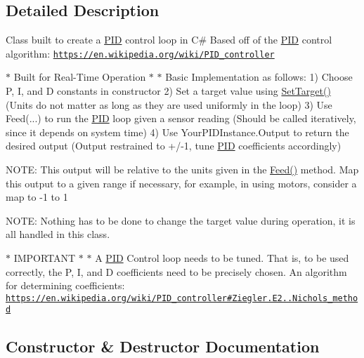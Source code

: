 \subsection{Detailed Description}
Class built to create a \hyperlink{class_robotics_library_1_1_controllers_1_1_p_i_d}{P\+ID} control loop in C\# Based off of the \hyperlink{class_robotics_library_1_1_controllers_1_1_p_i_d}{P\+ID} control algorithm\+: \href{https://en.wikipedia.org/wiki/PID_controller}{\tt https\+://en.\+wikipedia.\+org/wiki/\+P\+I\+D\+\_\+controller} 


\begin{DoxyItemize}
\item $\ast$ Built for Real-\/\+Time Operation $\ast$ $\ast$ Basic Implementation as follows\+: 1) Choose P, I, and D constants in constructor 2) Set a target value using {\ttfamily \hyperlink{class_robotics_library_1_1_controllers_1_1_p_i_d_aa4d528cb3b0adef1dfe42879319fcbb5}{Set\+Target()}} (Units do not matter as long as they are used uniformly in the loop) 3) Use {\ttfamily Feed(...)} to run the \hyperlink{class_robotics_library_1_1_controllers_1_1_p_i_d}{P\+ID} loop given a sensor reading (Should be called iteratively, since it depends on system time) 4) Use {\ttfamily Your\+P\+I\+D\+Instance.\+Output} to return the desired output (Output restrained to +/-\/1, tune \hyperlink{class_robotics_library_1_1_controllers_1_1_p_i_d}{P\+ID} coefficients accordingly)
\item N\+O\+TE\+: This output will be relative to the units given in the \hyperlink{class_robotics_library_1_1_controllers_1_1_p_i_d_a933cc736e6142b6ff531c33243c35549}{Feed()} method. Map this output to a given range if necessary, for example, in using motors, consider a map to -\/1 to 1
\item N\+O\+TE\+: Nothing has to be done to change the target value during operation, it is all handled in this class.
\item $\ast$ I\+M\+P\+O\+R\+T\+A\+NT $\ast$ $\ast$ A \hyperlink{class_robotics_library_1_1_controllers_1_1_p_i_d}{P\+ID} Control loop needs to be tuned. That is, to be used correctly, the P, I, and D coefficients need to be precisely chosen. An algorithm for determining coefficients\+: \href{https://en.wikipedia.org/wiki/PID_controller#Ziegler.E2.80.93Nichols_method}{\tt https\+://en.\+wikipedia.\+org/wiki/\+P\+I\+D\+\_\+controller\#\+Ziegler.\+E2..\+Nichols\+\_\+method} 
\end{DoxyItemize}

\subsection{Constructor \& Destructor Documentation}
\mbox{\label{class_robotics_library_1_1_controllers_1_1_p_i_d_a2b61da609180184fe7a40cba5d8d7cbf}} 
